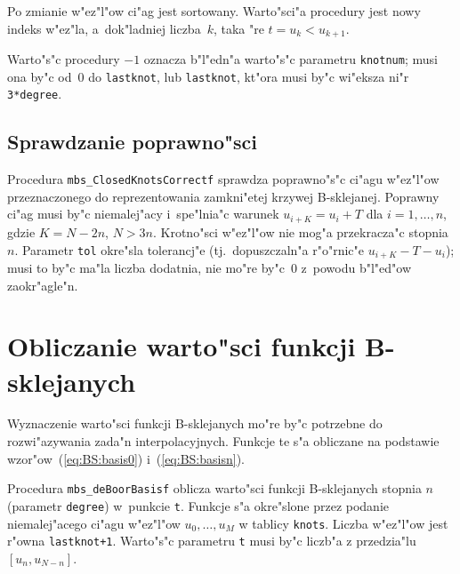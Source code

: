 Po zmianie w"ez"l"ow ci"ag jest sortowany. Warto"sci"a procedury jest
nowy indeks w"ez"la, a~dok"ladniej liczba~$k$, taka "re $t=u_k<u_{k+1}$.

Warto"s"c procedury $-1$ oznacza b"l"edn"a warto"s"c parametru \texttt{knotnum};
musi ona by"c od~$0$ do \texttt{lastknot}, lub \texttt{lastknot},
kt"ora musi by"c wi"eksza ni"r \texttt{3*degree}.


\subsection{Sprawdzanie poprawno"sci}

Procedura \texttt{mbs\_ClosedKnotsCorrectf} sprawdza poprawno"s"c ci"agu
w"ez"l"ow przeznaczonego do reprezentowania zamkni"etej krzywej B-sklejanej.
Poprawny ci"ag musi by"c niemalej"acy i~spe"lnia"c warunek $u_{i+K}=u_i+T$
dla $i=1,\ldots,n$, gdzie $K=N-2n$, $N>3n$. Krotno"sci w"ez"l"ow nie mog"a
przekracza"c stopnia~$n$. Parametr \texttt{tol} okre"sla
tolerancj"e (tj.\ dopuszczaln"a r"o"rnic"e $u_{i+K}-T-u_i$);
musi to by"c ma"la liczba dodatnia, nie mo"re by"c~$0$ z~powodu b"l"ed"ow
zaokr"agle"n.


\newpage
\section{Obliczanie warto"sci funkcji B-sklejanych}

Wyznaczenie warto"sci funkcji B-sklejanych mo"re by"c potrzebne do
rozwi"azywania zada"n interpolacyjnych. Funkcje te s"a obliczane na
podstawie wzor"ow~(\ref{eq:BS:basis0}) i~(\ref{eq:BS:basisn}).

\vspace{\bigskipamount}

\begin{sloppypar}
Procedura \texttt{mbs\_deBoorBasisf} oblicza warto"sci funkcji B-sklejanych
stopnia $n$ (parametr \texttt{degree}) w~punkcie \texttt{t}. Funkcje
s"a okre"s\-lo\-ne przez podanie niemalej"acego ci"agu w"ez\-"l"ow
$u_0,\ldots,u_M$ w tablicy \texttt{knots}. Liczba w"ez\-"l"ow jest
r"owna \texttt{lastknot+1}.
Warto"s"c parametru \texttt{t} musi by"c liczb"a z przedzia"lu
$[u_n,u_{N-n}]$.
\end{sloppypar}

